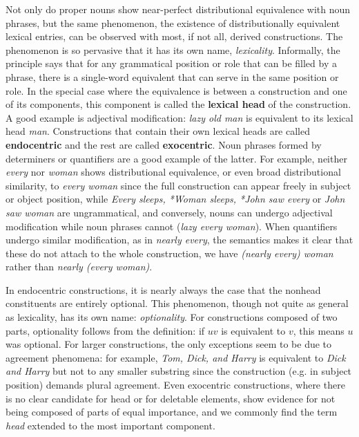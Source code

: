 Not only do proper nouns show near-perfect distributional equivalence with
noun phrases, but the same phenomenon, the existence of distributionally
equivalent lexical entries, can be observed with most, if not all, derived
constructions. The phenomenon is so pervasive that it has its own name, {\it
  lexicality}. Informally, the principle says that for any grammatical
position or role that can be filled by a phrase, there is a single-word
equivalent that can serve in the same position or role. In
the special case where the equivalence is between a construction and one of
its components, this component is called the {\bf lexical head} of the
construction. A good example is adjectival modification: {\it lazy old man} is
equivalent to its lexical head {\it man}.  Constructions that contain their
own lexical heads are called {\bf endocentric} and the rest are called {\bf
  exocentric}. Noun phrases formed by determiners or quantifiers are a good
example of the latter. For example, neither {\it every} nor {\it woman} shows
distributional equivalence, or even broad distributional similarity, to {\it
  every woman} since the full construction can appear freely in subject or
object position, while {\it *Every sleeps, *Woman sleeps, *John saw every} or
{\it *John saw woman} are ungrammatical, and conversely, nouns can undergo
adjectival modification while noun phrases cannot ({\it *lazy every
  woman}). When quantifiers undergo similar modification, as in {\it nearly
  every}, the semantics makes it clear that these do not attach to the whole
construction, we have {\it (nearly every) woman} rather than {\it nearly
  (every woman)}.

In endocentric constructions, it is nearly always the case that the nonhead
constituents are entirely optional. This phenomenon, though not quite as
general as lexicality, has its own name: {\it optionality}.  For constructions
composed of two parts, optionality follows from the definition: if $uv$ is
equivalent to $v$, this means $u$ was optional. For larger constructions, the
only exceptions seem to be due to agreement phenomena: for example, {\it Tom,
  Dick, and Harry} is equivalent to {\it Dick and Harry} but not to any smaller
substring since the construction (e.g. in subject position) demands plural
agreement. Even exocentric constructions, where there is no clear candidate
for head or for deletable elements, show evidence for not being composed of
parts of equal importance, and we commonly find the term {\it head} extended
to the most important component. 


